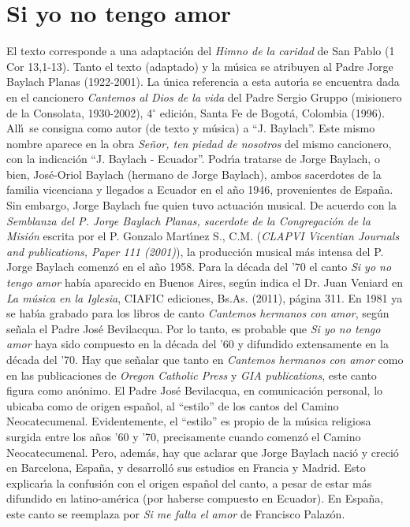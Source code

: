 \documentclass[landscape,12pt]{report}
\begin{document}
\section*{\small Si yo no tengo amor} \noindent\footnotesize El texto corresponde a una adaptaci\'on del \textit{Himno de la caridad} de San Pablo (1 Cor 13,1-13). Tanto el texto (adaptado) y la m\'usica se atribuyen al Padre Jorge Baylach Planas (1922-2001). La \'unica referencia a esta autor\'\i a se encuentra dada en el cancionero \emph{Cantemos al Dios de la vida} del Padre Sergio Gruppo (misionero de la Consolata, 1930-2002), 4$^\circ$ edici\'on, Santa Fe de Bogot\'a, Colombia (1996). All\'\i\ se consigna como autor (de texto y m\'usica) a ``J. Baylach''. Este mismo nombre aparece en la obra \emph{Se\~nor, ten piedad de nosotros} del mismo cancionero, con la indicaci\'on ``J. Baylach - Ecuador''. Podr\'\i a tratarse de Jorge Baylach, o bien, Jos\'e-Oriol Baylach (hermano de Jorge Baylach), ambos sacerdotes de la familia vicenciana y llegados a Ecuador en el a\~no 1946, provenientes de Espa\~na. Sin embargo, Jorge Baylach fue quien tuvo actuaci\'on musical. De acuerdo con la \emph{Semblanza del P. Jorge 
Baylach Planas, sacerdote de la Congregaci\'on de la Misi\'on} escrita por el P. Gonzalo Mart\'\i nez S., C.M. (\emph{CLAPVI Vicentian Journals and publications, Paper 111 (2001)}), la producci\'on musical m\'as intensa del P. Jorge Baylach comenz\'o en el a\~no 1958. Para la d\'ecada del '70 el canto \emph{Si yo no tengo amor} hab\'ia aparecido en Buenos Aires, seg\'un indica el Dr. Juan Veniard en \emph{La m\'usica en la Iglesia}, CIAFIC ediciones, Bs.As. (2011), p\'agina 311. En 1981 ya se hab\'\i a grabado para los libros de canto \emph{Cantemos hermanos con amor}, seg\'un se\~nala el Padre Jos\'e Bevilacqua. Por lo tanto, es probable que \emph{Si yo no tengo amor} haya sido compuesto en la d\'ecada del '60 y difundido extensamente en la d\'ecada del '70. Hay que se\~nalar que tanto en \emph{Cantemos hermanos con amor} como en las publicaciones de \emph{Oregon Catholic Press} y \emph{GIA publications}, este canto figura como an\'onimo. El Padre Jos\'e Bevilacqua, en comunicaci\'on personal, lo ubicaba 
como de origen espa\~nol, al ``estilo'' de los cantos del Camino Neocatecumenal. Evidentemente, el ``estilo'' es propio de la m\'usica religiosa surgida entre los a\~nos '60 y '70, precisamente cuando comenz\'o el Camino Neocatecumenal. Pero, adem\'as, hay que aclarar que Jorge Baylach naci\'o y creci\'o en Barcelona, Espa\~na, y desarroll\'o sus estudios en Francia y Madrid. Esto explicar\'\i a la confusi\'on con el origen espa\~nol del canto, a pesar de estar m\'as difundido en latino-am\'erica (por haberse compuesto en Ecuador). En Espa\~na, este canto se reemplaza por \emph{Si me falta el amor} de Francisco Palaz\'on.
\end{document}
